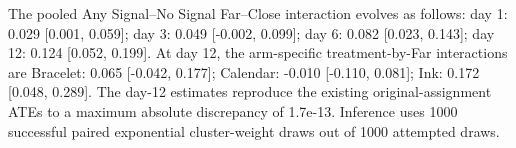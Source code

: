 The pooled Any Signal--No Signal Far--Close interaction evolves as follows: day 1: 0.029 [0.001, 0.059]; day 3: 0.049 [-0.002, 0.099]; day 6: 0.082 [0.023, 0.143]; day 12: 0.124 [0.052, 0.199].
At day 12, the arm-specific treatment-by-Far interactions are Bracelet: 0.065 [-0.042, 0.177]; Calendar: -0.010 [-0.110, 0.081]; Ink: 0.172 [0.048, 0.289].
The day-12 estimates reproduce the existing original-assignment ATEs to a maximum absolute discrepancy of 1.7e-13.
Inference uses 1000 successful paired exponential cluster-weight draws out of 1000 attempted draws.

